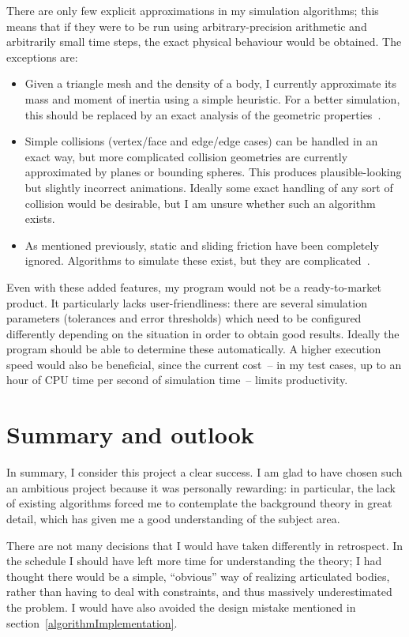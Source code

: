 There are only few explicit approximations in my simulation algorithms; this means that if they
were to be run using arbitrary-precision arithmetic and arbitrarily small time steps, the exact
physical behaviour would be obtained. The exceptions are:
\begin{itemize}
\item Given a triangle mesh and the density of a body, I currently approximate its mass and moment
    of inertia using a simple heuristic. For a better simulation, this should be
    replaced by an exact analysis of the geometric properties~\cite{Mirtich:96}.
\item Simple collisions (vertex/face and edge/edge cases) can be handled in an exact way, but
    more complicated collision geometries are currently approximated by planes or bounding
    spheres. This produces plausible-looking but slightly incorrect animations. Ideally some
    exact handling of any sort of collision would be desirable, but I am unsure whether such
    an algorithm exists.
\item As mentioned previously, static and sliding friction have been completely ignored.
    Algorithms to simulate these exist, but they are complicated~\cite{Baraff:PhD}.
\end{itemize}

Even with these added features, my program would not be a ready-to-market product. It particularly
lacks user-friendliness: there are several simulation parameters (tolerances and error thresholds)
which need to be configured differently depending on the situation in order to obtain good
results. Ideally the program should be able to determine these automatically. A higher execution
speed would also be beneficial, since the current cost~-- in my test cases, up to an hour of CPU
time per second of simulation time~-- limits productivity.

\section{Summary and outlook}

In summary, I consider this project a clear success. I am glad to have chosen such an ambitious
project because it was personally rewarding: in particular, the lack of existing algorithms
forced me to contemplate the background theory in great detail, which has given me a good
understanding of the subject area.

There are not many decisions that I would have taken differently in retrospect. In the schedule I
should have left more time for understanding the theory; I had thought there would be a simple,
``obvious'' way of realizing articulated bodies, rather than having to deal with constraints, and
thus massively underestimated the problem. I would have also avoided the design mistake mentioned
in section~\ref{algorithmImplementation}.

